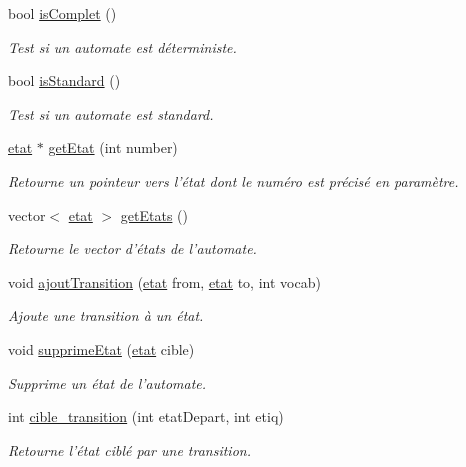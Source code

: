 \begin{DoxyCompactItemize}
bool \hyperlink{class_automate_aabb8bc1401cb3d3738a195126e029e2d}{is\-Complet} ()
\begin{DoxyCompactList}\small\item\em Test si un automate est déterministe. \end{DoxyCompactList}\item 
bool \hyperlink{class_automate_a763c4f441c8e0740a5ed0fbe16360a73}{is\-Standard} ()
\begin{DoxyCompactList}\small\item\em Test si un automate est standard. \end{DoxyCompactList}\item 
\hyperlink{classetat}{etat} $\ast$ \hyperlink{class_automate_a62ebaf51904bf539f74e87db01826999}{get\-Etat} (int number)
\begin{DoxyCompactList}\small\item\em Retourne un pointeur vers l'état dont le numéro est précisé en paramètre. \end{DoxyCompactList}\item 
vector$<$ \hyperlink{classetat}{etat} $>$ \hyperlink{class_automate_a656b9bc8d5daedee113b6429662b5d98}{get\-Etats} ()
\begin{DoxyCompactList}\small\item\em Retourne le vector d'états de l'automate. \end{DoxyCompactList}\item 
void \hyperlink{class_automate_a74a66bbf357d7fdd19f1d258ef3d2704}{ajout\-Transition} (\hyperlink{classetat}{etat} from, \hyperlink{classetat}{etat} to, int vocab)
\begin{DoxyCompactList}\small\item\em Ajoute une transition à un état. \end{DoxyCompactList}\item 
void \hyperlink{class_automate_a6456b3b223086aea9e4efa5ae35af931}{supprime\-Etat} (\hyperlink{classetat}{etat} cible)
\begin{DoxyCompactList}\small\item\em Supprime un état de l'automate. \end{DoxyCompactList}\item 
int \hyperlink{class_automate_ae1852a4e9b030309bc29b96cf67e1abf}{cible\-\_\-transition} (int etat\-Depart, int etiq)
\begin{DoxyCompactList}\small\item\em Retourne l'état ciblé par une transition. \end{DoxyCompactList}\item 

\end{DoxyCompactItemize}
